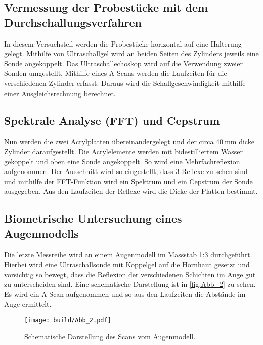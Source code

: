 \subsection{Vermessung der Probestücke mit dem Durchschallungsverfahren}
\label{subsec:SchallDurchV_durch}

In diesem Versuchsteil werden die Probestücke horizontal auf eine Halterung gelegt. 
Mithilfe von Ultraschallgel wird an beiden Seiten des Zylinders jeweils eine Sonde angekoppelt.
Das Ultraschallechoskop wird auf die Verwendung zweier Sonden umgestellt.
Mithilfe eines A-Scans werden die Laufzeiten für die verschiedenen Zylinder erfasst.
Daraus wird die Schallgeschwindigkeit mithilfe einer Ausgleichsrechnung berechnet.

\subsection{Spektrale Analyse (FFT) und Cepstrum}
\label{subsec:FFT_durch}
Nun werden die zwei Acrylplatten übereinandergelegt und der circa $\qty{40}{\milli\meter}$ dicke Zylinder daraufgestellt. 
Die Acrylelemente werden mit bidestilliertem Wasser gekoppelt und oben eine Sonde angekoppelt.
So wird eine Mehrfachreflexion aufgenommen.
Der Ausschnitt wird so eingestellt, dass $3$ Reflexe zu sehen sind und mithilfe der FFT-Funktion wird ein Spektrum und ein Cepstrum 
der Sonde ausgegeben.
Aus den Laufzeiten der Reflexe wird die Dicke der Platten bestimmt.

\subsection{Biometrische Untersuchung eines Augenmodells}
\label{subsec:Augew1_durch}

Die letzte Messreihe wird an einem Augenmodell im Massstab 1:3 durchgeführt.
Hierbei wird eine Ultraschallsonde mit Koppelgel auf die Hornhaut gesetzt und vorsichtig so bewegt, dass die Reflexion der 
verschiedenen Schichten im Auge gut zu unterscheiden sind.
Eine schematische Darstellung ist in \autoref{fig:Abb_2} zu sehen.
Es wird ein A-Scan aufgenommen und so aus den Laufzeiten die Abstände im Auge ermittelt.
\begin{figure}[H]
    \centering
    \texttt{[image: build/Abb\_2.pdf]}
    \caption {Schematische Darstellung des Scans vom Augenmodell\cite{VUS1}.}
    \label{fig:Abb_2}
  \end{figure}
